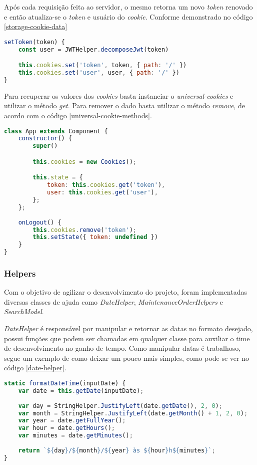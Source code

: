 Após cada requisição feita ao servidor, o mesmo retorna um novo \textit{token} renovado e então atualiza-se o \textit{token} e usuário do \textit{cookie}.
Conforme demonstrado no código \ref{storage-cookie-data}

\begin{lstlisting}[language=JavaScript, caption={Gravar dados no cookie}, label={storage-cookie-data}]
setToken(token) {
	const user = JWTHelper.decomposeJwt(token)

	this.cookies.set('token', token, { path: '/' })
	this.cookies.set('user', user, { path: '/' })
}
\end{lstlisting}

Para recuperar os valores dos \textit{cookies} basta instanciar o \textit{universal-cookies} e utilizar o método \textit{get}. Para remover o dado basta utilizar o método \textit{remove}, de acordo com o código \ref{universal-cookie-methods}.

\begin{lstlisting}[language=JavaScript, caption={Recuperar dados do cookie}, label={universal-cookie-methods}]
class App extends Component {
	constructor() {
		super()

		this.cookies = new Cookies();

		this.state = { 
			token: this.cookies.get('token'),
			user: this.cookies.get('user'),
		};
	};
	
	onLogout() {
		this.cookies.remove('token');
		this.setState({ token: undefined })
	}
}
\end{lstlisting}

\subsubsection{Helpers}
Com o objetivo de agilizar o desenvolvimento do projeto, foram implementadas diversas classes de ajuda como \textit{DateHelper}, \textit{MaintenanceOrderHelpers} e \textit{SearchModel}.

\textit{DateHelper} é responsável por manipular e retornar as datas no formato desejado, possui funções que podem ser chamadas em qualquer classe para auxiliar o time de desenvolvimento no ganho de tempo. Como manipular datas é trabalhoso, segue um exemplo de como deixar um pouco mais simples, como pode-se ver no código \ref{date-helper}.

\begin{lstlisting}[language=JavaScript, caption={Função que formata a data em dia/mês/ano - horas/minutos}, label={date-helper}]
static formatDateTime(inputDate) {
	var date = this.getDate(inputDate);
	
	var day = StringHelper.JustifyLeft(date.getDate(), 2, 0);
	var month = StringHelper.JustifyLeft(date.getMonth() + 1, 2, 0);
	var year = date.getFullYear();
	var hour = date.getHours();
	var minutes = date.getMinutes();
	
	return `${day}/${month}/${year} às ${hour}h${minutes}`;
}
\end{lstlisting}

